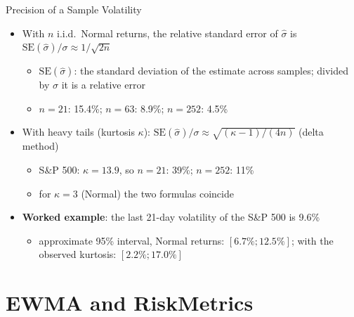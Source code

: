 \begin{frame}{Precision of a Sample Volatility}
\itemsize{\small}
\begin{itemize}
    \item With $n$ i.i.d.\ Normal returns, the relative standard error of $\hat\sigma$ is $\mathrm{SE}(\hat\sigma)/\sigma \approx 1/\sqrt{2n}$
    \begin{itemize}
        \item $\mathrm{SE}(\hat\sigma)$: the standard deviation of the estimate across samples; divided by $\sigma$ it is a relative error
        \item $n = 21$: 15.4\%; $n = 63$: 8.9\%; $n = 252$: 4.5\%
    \end{itemize}
    \item With heavy tails (kurtosis $\kappa$): $\mathrm{SE}(\hat\sigma)/\sigma \approx \sqrt{(\kappa - 1)/(4n)}$ (delta method)
    \begin{itemize}
        \item S\&P 500: $\kappa = 13.9$, so $n = 21$: 39\%; $n = 252$: 11\%
        \item for $\kappa = 3$ (Normal) the two formulas coincide
    \end{itemize}
    \item \textbf{Worked example}: the last 21-day volatility of the S\&P 500 is 9.6\%
    \begin{itemize}
        \item approximate 95\% interval, Normal returns: $[6.7\%; 12.5\%]$; with the observed kurtosis: $[2.2\%; 17.0\%]$
    \end{itemize}
\end{itemize}
\end{frame}


\section{EWMA and RiskMetrics}

